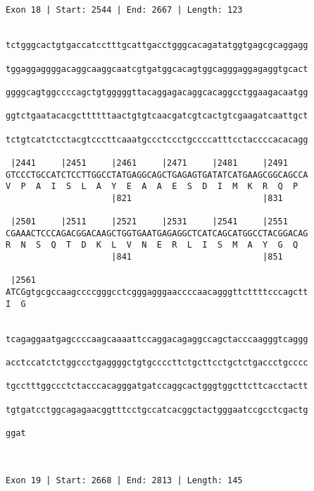 \documentclass{article}
\begin{document}
\begin{Verbatim}
                                   
 
Exon 18 | Start: 2544 | End: 2667 | Length: 123


tctgggcactgtgaccatcctttgcattgacctgggcacagatatggtgagcgcaggagg
                                                            
tggaggaggggacaggcaaggcaatcgtgatggcacagtggcagggaggagaggtgcact
                                                            
ggggcagtggccccagctgtgggggttacaggagacaggcacaggcctggaagacaatgg
                                                            
ggtctgaatacacgcttttttaactgtgtcaacgatcgtcactgtcgaagatcaattgct
                                                            
tctgtcatctcctacgtcccttcaaatgccctccctgccccatttcctaccccacacagg
                                                            
 |2441     |2451     |2461     |2471     |2481     |2491    
GTCCCTGCCATCTCCTTGGCCTATGAGGCAGCTGAGAGTGATATCATGAAGCGGCAGCCA
V  P  A  I  S  L  A  Y  E  A  A  E  S  D  I  M  K  R  Q  P  
                     |821                          |831     
  
 |2501     |2511     |2521     |2531     |2541     |2551    
CGAAACTCCCAGACGGACAAGCTGGTGAATGAGAGGCTCATCAGCATGGCCTACGGACAG
R  N  S  Q  T  D  K  L  V  N  E  R  L  I  S  M  A  Y  G  Q  
                     |841                          |851     
  
 |2561                                                      
ATCGgtgcgccaagccccgggcctcgggagggaaccccaacagggttcttttcccagctt
I  G                                                        
                                                            
  
tcagaggaatgagccccaagcaaaattccaggacagaggccagctacccaagggtcaggg
                                                            
acctccatctctggccctgaggggctgtgccccttctgcttcctgctctgaccctgcccc
                                                            
tgcctttggccctctacccacagggatgatccaggcactgggtggcttcttcacctactt
                                                            
tgtgatcctggcagagaacggtttcctgccatcacggctactgggaatccgcctcgactg
                                                            
ggat
    
    
 
Exon 19 | Start: 2668 | End: 2813 | Length: 145



\end{Verbatim}
\end{document}
